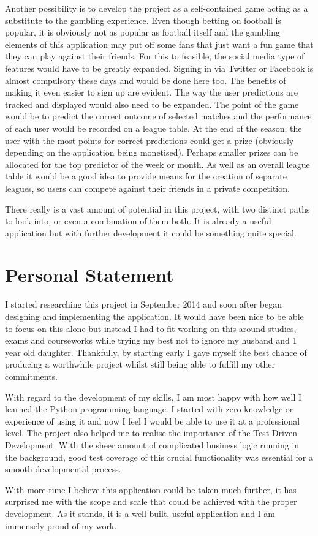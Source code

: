 Another possibility is to develop the project as a self-contained game acting as a substitute to the gambling experience. Even though betting on football is popular, it is obviously not as popular as football itself and the gambling elements of this application may put off some fans that just want a fun game that they can play against their friends. For this to feasible, the social media type of features would have to be greatly expanded. Signing in via Twitter or Facebook is almost compulsory these days and would be done here too. The benefits of making it even easier to sign up are evident. The way the user predictions are tracked and displayed would also need to be expanded. The point of the game would be to predict the correct outcome of selected matches and the performance of each user would be recorded on a league table. At the end of the season, the user with the most points for correct predictions could get a prize (obviously depending on the application being monetised). Perhaps smaller prizes can be allocated for the top predictor of the week or month. As well as an overall league table it would be a good idea to provide means for the creation of separate leagues, so users can compete against their friends in a private competition.

There really is a vast amount of potential in this project, with two distinct paths to look into, or even a combination of them both. It is already a useful application but with further development it could be something quite special.

\section{Personal Statement}
\label{sec:personalstatement_conclusion}
I started researching this project in September 2014 and soon after began designing and implementing the application. It would have been nice to be able to focus on this alone but instead I had to fit working on this around studies, exams and courseworks while trying my best not to ignore my husband and 1 year old daughter. Thankfully, by starting early I gave myself the best chance of producing a worthwhile project whilst still being able to fulfill my other commitments.

With regard to the development of my skills, I am most happy with how well I learned the Python programming language. I started with zero knowledge or experience of using it and now I feel I would be able to use it at a professional level. The project also helped me to realise the importance of the Test Driven Development. With the sheer amount of complicated business logic running in the background, good test coverage of this crucial functionality was essential for a smooth developmental process. 

With more time I believe this application could be taken much further, it has surprised me with the scope and scale that could be achieved with the proper development. As it stands, it is a well built, useful application and I am immensely proud of my work. 